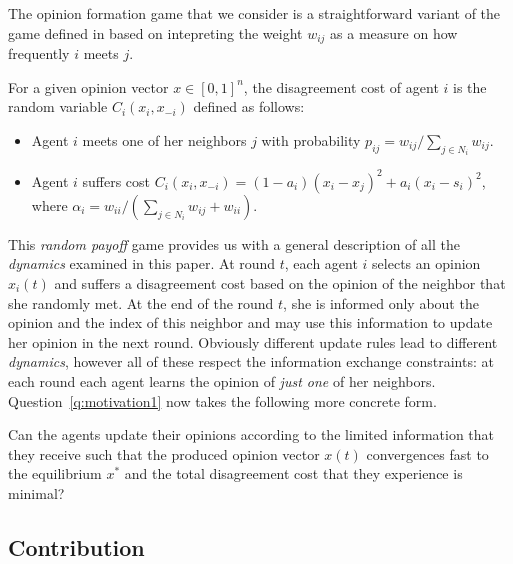The opinion formation game that we consider is a straightforward variant of the
game defined in \cite{BKO11} based on intepreting the weight $w_{ij}$ as a
measure on how frequently $i$ meets $j$.
%
\begin{definition}\label{d:random_game}
  For a given opinion vector $x \in [0,1]^n$, the disagreement cost of agent
  $i$ is the random variable $C_i(x_i,x_{-i})$ defined as follows:
  \begin{itemize}
    \item Agent $i$ meets one of her neighbors $j$ with probability $p_{ij}=
      w_{ij}/\sum_{j\in N_i}w_{ij}$.
    \item Agent $i$ suffers cost $C_i(x_i , x_{-i}) = (1-a_i)(x_i-x_j)^2 +
      a_i(x_i-s_i)^2$, where $\alpha_i = w_{ii}/(\sum_{j\in
        N_i}w_{ij}+w_{ii})$.
  \end{itemize}
\end{definition}
%
This \emph{random payoff} game provides us with a general description of all
the \emph{dynamics} examined in this paper. At round $t$, each agent $i$
selects an opinion $x_i(t)$ and suffers a disagreement cost based on the
opinion of the neighbor that she randomly met.  At the end of the round $t$,
she is informed only about the opinion and the index of this neighbor and may
use this information to update her opinion in the next round.  Obviously
different update rules lead to different \emph{dynamics}, however all of these
respect the information exchange constraints: at each round each agent learns
the opinion of \emph{just one} of her neighbors.  Question~\ref{q:motivation1}
now takes the following more concrete form.

\begin{question}\label{q:motivation2}
  Can the agents update their opinions according to the limited information
  that they receive such that the produced opinion vector $x(t)$ convergences
  fast to the equilibrium $x^*$ and the total disagreement cost that they
  experience is minimal?
%
\end{question}


\subsection{Contribution}

